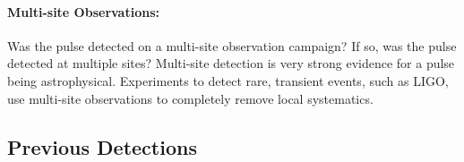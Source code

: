 \documentclass[a4paper,fleqn,usenatbib]{mnras}
\begin{document}
\paragraph{Multi-site Observations:}

Was the pulse detected on a multi-site observation campaign? If so, was the
pulse detected at multiple sites? Multi-site detection is very strong evidence
for a pulse being astrophysical. Experiments to detect rare, transient events,
such as LIGO, use multi-site observations to completely remove local
systematics.


\subsection{Previous Detections}



\end{document}
